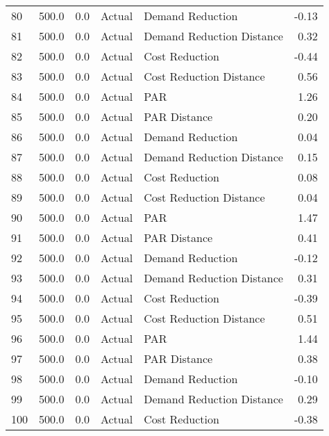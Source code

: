 \begin{longtable}{lrrllr}
80   &        500.0 &     0.0 &         Actual &           Demand Reduction &  -0.13 \\
81   &        500.0 &     0.0 &         Actual &  Demand Reduction Distance &   0.32 \\
82   &        500.0 &     0.0 &         Actual &             Cost Reduction &  -0.44 \\
83   &        500.0 &     0.0 &         Actual &    Cost Reduction Distance &   0.56 \\
84   &        500.0 &     0.0 &         Actual &                        PAR &   1.26 \\
85   &        500.0 &     0.0 &         Actual &               PAR Distance &   0.20 \\
86   &        500.0 &     0.0 &         Actual &           Demand Reduction &   0.04 \\
87   &        500.0 &     0.0 &         Actual &  Demand Reduction Distance &   0.15 \\
88   &        500.0 &     0.0 &         Actual &             Cost Reduction &   0.08 \\
89   &        500.0 &     0.0 &         Actual &    Cost Reduction Distance &   0.04 \\
90   &        500.0 &     0.0 &         Actual &                        PAR &   1.47 \\
91   &        500.0 &     0.0 &         Actual &               PAR Distance &   0.41 \\
92   &        500.0 &     0.0 &         Actual &           Demand Reduction &  -0.12 \\
93   &        500.0 &     0.0 &         Actual &  Demand Reduction Distance &   0.31 \\
94   &        500.0 &     0.0 &         Actual &             Cost Reduction &  -0.39 \\
95   &        500.0 &     0.0 &         Actual &    Cost Reduction Distance &   0.51 \\
96   &        500.0 &     0.0 &         Actual &                        PAR &   1.44 \\
97   &        500.0 &     0.0 &         Actual &               PAR Distance &   0.38 \\
98   &        500.0 &     0.0 &         Actual &           Demand Reduction &  -0.10 \\
99   &        500.0 &     0.0 &         Actual &  Demand Reduction Distance &   0.29 \\
100  &        500.0 &     0.0 &         Actual &             Cost Reduction &  -0.38 \\

\end{longtable}
